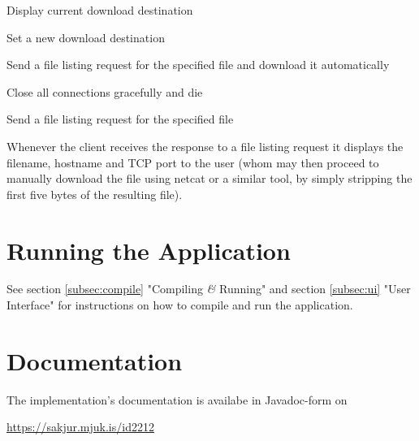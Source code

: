 \documentclass[11pt]{article}
\begin{document}
\begin{description}[align=right]
    \item[destination] Display current download destination
    \item[destination $<$path$>$] Set a new download destination
    \item[download $<$file$>$] Send a file listing request for the specified
        file and download it automatically
    \item[exit] Close all connections gracefully and die
    \item[find $<$file$>$] Send a file listing request for the specified file
\end{description}

Whenever the client receives the response to a file listing request it displays
the filename, hostname and TCP port to the user (whom may then proceed to
manually download the file using netcat or a similar tool, by simply stripping
the first five bytes of the resulting file).

\section{Running the Application}

See section \ref{subsec:compile} "Compiling \textit{\&} Running" and
section \ref{subsec:ui} "User Interface" for instructions on how to compile and
run the application.

\section{Documentation}

The implementation's documentation is availabe in Javadoc-form on 

\url{https://sakjur.mjuk.is/id2212}
\end{document}
